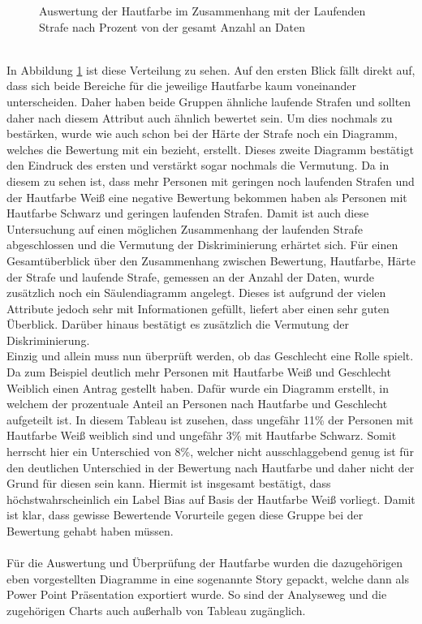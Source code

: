 \begin{onehalfspace}
\begin{figure}[h]
    \caption{Auswertung der Hautfarbe im Zusammenhang mit der Laufenden Strafe nach Prozent von der gesamt Anzahl an Daten}
    \label{fig:TabHaut3}
\end{figure}\\
In Abbildung \ref{fig:TabHaut3} ist diese Verteilung zu sehen. Auf den ersten Blick fällt direkt auf, dass sich beide Bereiche für die jeweilige Hautfarbe kaum voneinander unterscheiden. Daher haben beide Gruppen ähnliche laufende Strafen und sollten daher nach diesem Attribut auch ähnlich bewertet sein. Um dies nochmals zu bestärken, wurde wie auch schon bei der Härte der Strafe noch ein Diagramm, welches die Bewertung mit ein bezieht, erstellt. Dieses zweite Diagramm bestätigt den Eindruck des ersten und verstärkt sogar nochmals die Vermutung. Da in diesem zu sehen ist, dass mehr Personen mit geringen noch laufenden Strafen und der Hautfarbe Weiß eine negative Bewertung bekommen haben als Personen mit Hautfarbe Schwarz und geringen laufenden Strafen. Damit ist auch diese Untersuchung auf einen möglichen Zusammenhang der laufenden Strafe abgeschlossen und die Vermutung der Diskriminierung erhärtet sich. Für einen Gesamtüberblick über den Zusammenhang zwischen Bewertung, Hautfarbe, Härte der Strafe und laufende Strafe, gemessen an der Anzahl der Daten, wurde zusätzlich noch ein Säulendiagramm angelegt. Dieses ist aufgrund der vielen Attribute jedoch sehr mit Informationen gefüllt, liefert aber einen sehr guten Überblick. Darüber hinaus bestätigt es zusätzlich die Vermutung der Diskriminierung.\\
Einzig und allein muss nun überprüft werden, ob das Geschlecht eine Rolle spielt. Da zum Beispiel deutlich mehr Personen mit Hautfarbe Weiß und Geschlecht Weiblich einen Antrag gestellt haben. Dafür wurde ein Diagramm erstellt, in welchem der prozentuale Anteil an Personen nach Hautfarbe und Geschlecht aufgeteilt ist. In diesem Tableau ist zusehen, dass ungefähr 11\% der Personen mit Hautfarbe Weiß weiblich sind und ungefähr 3\% mit Hautfarbe Schwarz. Somit herrscht hier ein Unterschied von 8\%, welcher nicht ausschlaggebend genug ist für den deutlichen Unterschied in der Bewertung nach Hautfarbe und daher nicht der Grund für diesen sein kann. Hiermit ist insgesamt bestätigt, dass höchstwahrscheinlich ein Label Bias auf Basis der Hautfarbe Weiß vorliegt. Damit ist klar, dass gewisse Bewertende Vorurteile gegen diese Gruppe bei der Bewertung gehabt haben müssen.\\\\
Für die Auswertung und Überprüfung der Hautfarbe wurden die dazugehörigen eben vorgestellten Diagramme in eine sogenannte Story gepackt, welche dann als Power Point Präsentation exportiert wurde. So sind der Analyseweg und die zugehörigen Charts auch außerhalb von Tableau zugänglich.\\ 

\end{onehalfspace}
